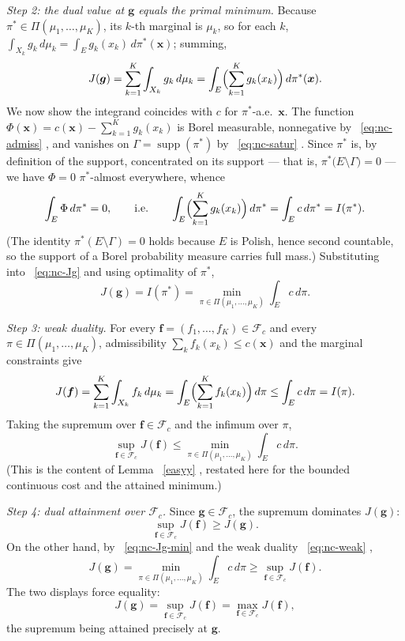 \documentclass[twoside,11pt,a4paper]{article}
\newcommand*{\SavedEqref}{}
\let\SavedEqref\eqref
\renewcommand*{\eqref}[1]{  \begingroup
    \hypersetup{
      linkcolor=linkequation,
      linkbordercolor=linkequation,
    }    \SavedEqref{#1}  \endgroup
}
\newcommand*{\SavedRef}{}
\let\SavedRef\ref
\renewcommand*{\ref}[1]{  \begingroup
    \hypersetup{
      linkcolor=linkequation,
      linkbordercolor=linkequation,
    }    \SavedRef{#1}  \endgroup
}
\begin{document}
\medskip
\noindent\emph{Step 2: the dual value at $\boldsymbol g$ equals the primal
minimum.}
Because $\pi^*\in\Pi(\mu_1,\dots,\mu_K)$, its $k$-th marginal is $\mu_k$, so for
each $k$, $\int_{X_k}g_k\,d\mu_k=\int_E g_k(x_k)\,d\pi^*(\boldsymbol x)$; summing,
\begin{equation}\label{eq:nc-Jg}
J(\boldsymbol g)
=\sum_{k=1}^K\int_{X_k}g_k\,d\mu_k
=\int_E\Bigl(\sum_{k=1}^K g_k(x_k)\Bigr)\,d\pi^*(\boldsymbol x).
\end{equation}
We now show the integrand coincides with $c$ for $\pi^*$-a.e.\ $\boldsymbol x$.
The function $\Phi(\boldsymbol x)=c(\boldsymbol x)-\sum_{k=1}^K g_k(x_k)$ is
Borel measurable, nonnegative by~\eqref{eq:nc-admiss}, and vanishes on
$\Gamma=\operatorname{supp}(\pi^*)$ by~\eqref{eq:nc-satur}. Since $\pi^*$ is, by
definition of the support, concentrated on its support — that is,
$\pi^*\bigl(E\setminus\Gamma\bigr)=0$ — we have $\Phi=0$ $\pi^*$-almost
everywhere, whence
\[
\int_E\Phi\,d\pi^*=0,
\qquad\text{i.e.}\qquad
\int_E\Bigl(\sum_{k=1}^K g_k(x_k)\Bigr)\,d\pi^*
=\int_E c\,d\pi^*=I(\pi^*).
\]
(The identity $\pi^*(E\setminus\Gamma)=0$ holds because $E$ is Polish, hence
second countable, so the support of a Borel probability measure carries full
mass.) Substituting into~\eqref{eq:nc-Jg} and using optimality of $\pi^*$,
\begin{equation}\label{eq:nc-Jg-min}
J(\boldsymbol g)=I(\pi^*)
=\min_{\pi\in\Pi(\mu_1,\dots,\mu_K)}\int_E c\,d\pi.
\end{equation}

\medskip
\noindent\emph{Step 3: weak duality.}
For every $\boldsymbol f=(f_1,\dots,f_K)\in\mathcal F_c$ and every
$\pi\in\Pi(\mu_1,\dots,\mu_K)$, admissibility
$\sum_k f_k(x_k)\le c(\boldsymbol x)$ and the marginal constraints give
\[
J(\boldsymbol f)=\sum_{k=1}^K\int_{X_k}f_k\,d\mu_k
=\int_E\Bigl(\sum_{k=1}^K f_k(x_k)\Bigr)\,d\pi
\le\int_E c\,d\pi=I(\pi).
\]
Taking the supremum over $\boldsymbol f\in\mathcal F_c$ and the infimum over
$\pi$,
\begin{equation}\label{eq:nc-weak}
\sup_{\boldsymbol f\in\mathcal F_c}J(\boldsymbol f)
\le\min_{\pi\in\Pi(\mu_1,\dots,\mu_K)}\int_E c\,d\pi.
\end{equation}
(This is the content of Lemma~\ref{easyy}, restated here for the bounded
continuous cost and the attained minimum.)

\medskip
\noindent\emph{Step 4: dual attainment over $\mathcal F_c$.}
Since $\boldsymbol g\in\mathcal F_c$, the supremum dominates $J(\boldsymbol g)$:
\[
\sup_{\boldsymbol f\in\mathcal F_c}J(\boldsymbol f)\ge J(\boldsymbol g).
\]
On the other hand, by~\eqref{eq:nc-Jg-min} and the weak
duality~\eqref{eq:nc-weak},
\[
J(\boldsymbol g)
=\min_{\pi\in\Pi(\mu_1,\dots,\mu_K)}\int_E c\,d\pi
\ge\sup_{\boldsymbol f\in\mathcal F_c}J(\boldsymbol f).
\]
The two displays force equality:
\begin{equation}\label{eq:nc-attain-Fc}
J(\boldsymbol g)=\sup_{\boldsymbol f\in\mathcal F_c}J(\boldsymbol f)
=\max_{\boldsymbol f\in\mathcal F_c}J(\boldsymbol f),
\end{equation}
the supremum being attained precisely at $\boldsymbol g$.
\end{document}
